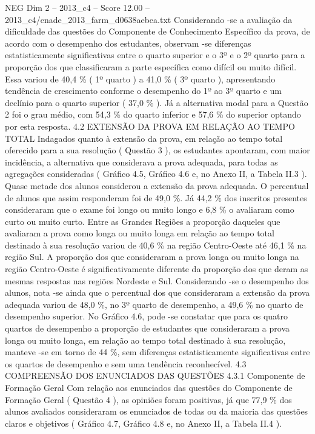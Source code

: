 \begin{textsample}{NEG Dim 2 – 2013\_c4 – Score 12.00 – 2013\_c4/enade\_2013\_farm\_d0638aebea.txt}
Considerando -se a avaliação da dificuldade das questões do Componente de Conhecimento Específico da prova, de acordo com o desempenho dos estudantes, observam -se diferenças estatisticamente significativas entre o quarto superior e o 3º e o 2º quarto para a proporção dos que classificaram a parte específica como difícil ou muito difícil.
Essa variou de 40,4 \% ( 1º quarto ) a 41,0 \% ( 3º quarto ), apresentando tendência de crescimento conforme o desempenho do 1º ao 3º quarto e um declínio para o quarto superior ( 37,0 \% ).
Já a alternativa modal para a Questão 2 foi o grau médio, com 54,3 \% do quarto inferior e 57,6 \% do superior optando por esta resposta. 4.2 EXTENSÃO DA PROVA EM RELAÇÃO AO TEMPO TOTAL Indagados quanto à extensão da prova, em relação ao tempo total oferecido para a sua resolução ( Questão 3 ), os estudantes apontaram, com maior incidência, a alternativa que considerava a prova adequada, para todas as agregações consideradas ( Gráfico 4.5, Gráfico 4.6 e, no Anexo II, a Tabela II.3 ).
Quase metade dos alunos considerou a extensão da prova adequada.
O percentual de alunos que assim responderam foi de 49,0 \%.
Já 44,2 \% dos inscritos presentes consideraram que o exame foi longo ou muito longo e 6,8 \% o avaliaram como curto ou muito curto.
Entre as Grandes Regiões a proporção daqueles que avaliaram a prova como longa ou muito longa em relação ao tempo total destinado à sua resolução variou de 40,6 \% na região Centro-Oeste até 46,1 \% na região Sul.
A proporção dos que consideraram a prova longa ou muito longa na região Centro-Oeste é significativamente diferente da proporção dos que deram as mesmas respostas nas regiões Nordeste e Sul.
Considerando -se o desempenho dos alunos, nota -se ainda que o percentual dos que consideraram a extensão da prova adequada variou de 48,0 \%, no 3º quarto de desempenho, a 49,6 \% no quarto de desempenho superior.
No Gráfico 4.6, pode -se constatar que para os quatro quartos de desempenho a proporção de estudantes que consideraram a prova longa ou muito longa, em relação ao tempo total destinado à sua resolução, manteve -se em torno de 44 \%, sem diferenças estatisticamente significativas entre os quartos de desempenho e sem uma tendência reconhecível. 4.3 COMPREENSÃO DOS ENUNCIADOS DAS QUESTÕES 4.3.1 Componente de Formação Geral Com relação aos enunciados das questões do Componente de Formação Geral ( Questão 4 ), as opiniões foram positivas, já que 77,9 \% dos alunos avaliados consideraram os enunciados de todas ou da maioria das questões claros e objetivos ( Gráfico 4.7, Gráfico 4.8 e, no Anexo II, a Tabela II.4 ).

\end{textsample}
